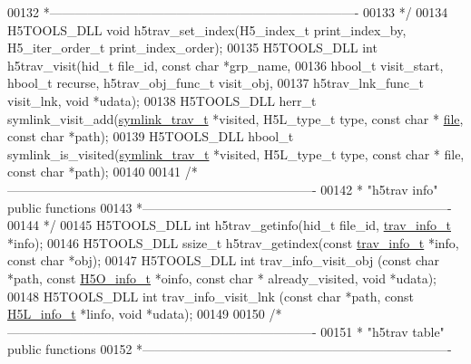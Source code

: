 \begin{DoxyCode}
00132 \textcolor{comment}{ *-------------------------------------------------------------------------}
00133 \textcolor{comment}{ */}
00134 H5TOOLS\_DLL \textcolor{keywordtype}{void} h5trav\_set\_index(H5\_index\_t print\_index\_by, H5\_iter\_order\_t print\_index\_order);
00135 H5TOOLS\_DLL \textcolor{keywordtype}{int} h5trav\_visit(hid\_t file\_id, \textcolor{keyword}{const} \textcolor{keywordtype}{char} *grp\_name, 
00136     hbool\_t visit\_start, hbool\_t recurse, h5trav\_obj\_func\_t visit\_obj, 
00137     h5trav\_lnk\_func\_t visit\_lnk, \textcolor{keywordtype}{void} *udata);
00138 H5TOOLS\_DLL herr\_t symlink\_visit\_add(\hyperlink{structsymlink__trav__t}{symlink\_trav\_t} *visited, H5L\_type\_t type, \textcolor{keyword}{const} \textcolor{keywordtype}{char} *
      \hyperlink{structfile}{file}, \textcolor{keyword}{const} \textcolor{keywordtype}{char} *path);
00139 H5TOOLS\_DLL hbool\_t symlink\_is\_visited(\hyperlink{structsymlink__trav__t}{symlink\_trav\_t} *visited, H5L\_type\_t type, \textcolor{keyword}{const} \textcolor{keywordtype}{char} *
      file, \textcolor{keyword}{const} \textcolor{keywordtype}{char} *path);
00140 
00141 \textcolor{comment}{/*-------------------------------------------------------------------------}
00142 \textcolor{comment}{ * "h5trav info" public functions}
00143 \textcolor{comment}{ *-------------------------------------------------------------------------}
00144 \textcolor{comment}{ */}
00145 H5TOOLS\_DLL \textcolor{keywordtype}{int} h5trav\_getinfo(hid\_t file\_id, \hyperlink{structtrav__info__t}{trav\_info\_t} *info);
00146 H5TOOLS\_DLL ssize\_t h5trav\_getindex(\textcolor{keyword}{const} \hyperlink{structtrav__info__t}{trav\_info\_t} *info, \textcolor{keyword}{const} \textcolor{keywordtype}{char} *obj);
00147 H5TOOLS\_DLL \textcolor{keywordtype}{int} trav\_info\_visit\_obj (\textcolor{keyword}{const} \textcolor{keywordtype}{char} *path, \textcolor{keyword}{const} \hyperlink{struct_h5_o__info__t}{H5O\_info\_t} *oinfo, \textcolor{keyword}{const} \textcolor{keywordtype}{char} *
      already\_visited, \textcolor{keywordtype}{void} *udata);
00148 H5TOOLS\_DLL \textcolor{keywordtype}{int} trav\_info\_visit\_lnk (\textcolor{keyword}{const} \textcolor{keywordtype}{char} *path, \textcolor{keyword}{const} \hyperlink{struct_h5_l__info__t}{H5L\_info\_t} *linfo, \textcolor{keywordtype}{void} *udata);
00149 
00150 \textcolor{comment}{/*-------------------------------------------------------------------------}
00151 \textcolor{comment}{ * "h5trav table" public functions}
00152 \textcolor{comment}{ *-------------------------------------------------------------------------}

\end{DoxyCode}
